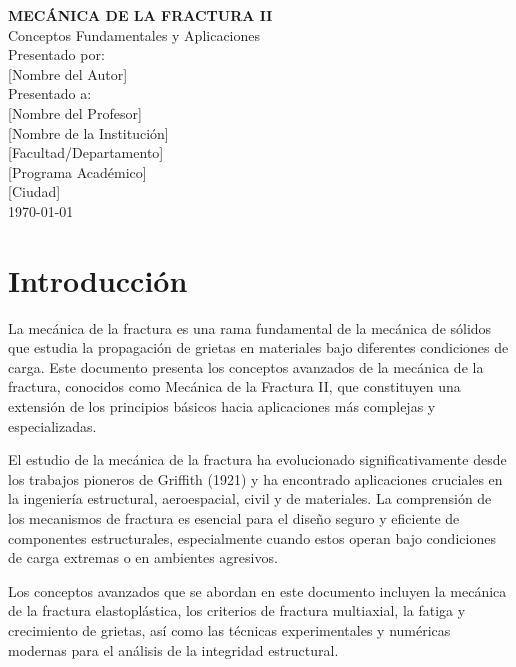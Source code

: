 \documentclass[12pt,letterpaper]{article}
\begin{document}
\begin{titlepage}
\centering
\vspace*{2cm}

{\Large\textbf{MECÁNICA DE LA FRACTURA II}}\\[0.5cm]
{\large Conceptos Fundamentales y Aplicaciones}\\[2cm]

{\large Presentado por:}\\[0.5cm]
{\large [Nombre del Autor]}\\[1cm]

{\large Presentado a:}\\[0.5cm]
{\large [Nombre del Profesor]}\\[2cm]

{\large [Nombre de la Institución]}\\
{\large [Facultad/Departamento]}\\
{\large [Programa Académico]}\\[2cm]

{\large [Ciudad]}\\
{\large \today}

\end{titlepage}

\newpage
\tableofcontents
\newpage

\section{Introducción}

La mecánica de la fractura es una rama fundamental de la mecánica de sólidos que estudia la propagación de grietas en materiales bajo diferentes condiciones de carga. Este documento presenta los conceptos avanzados de la mecánica de la fractura, conocidos como Mecánica de la Fractura II, que constituyen una extensión de los principios básicos hacia aplicaciones más complejas y especializadas.

El estudio de la mecánica de la fractura ha evolucionado significativamente desde los trabajos pioneros de Griffith (1921) y ha encontrado aplicaciones cruciales en la ingeniería estructural, aeroespacial, civil y de materiales. La comprensión de los mecanismos de fractura es esencial para el diseño seguro y eficiente de componentes estructurales, especialmente cuando estos operan bajo condiciones de carga extremas o en ambientes agresivos.

Los conceptos avanzados que se abordan en este documento incluyen la mecánica de la fractura elastoplástica, los criterios de fractura multiaxial, la fatiga y crecimiento de grietas, así como las técnicas experimentales y numéricas modernas para el análisis de la integridad estructural.
\end{document}
